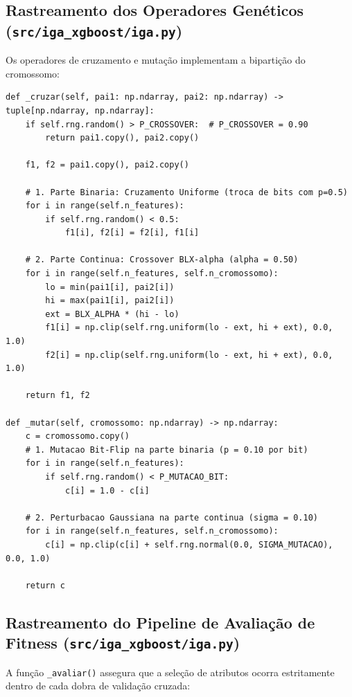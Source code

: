 \documentclass[11pt,a4paper]{article}
\begin{document}
\subsection{Rastreamento dos Operadores Genéticos (\texttt{src/iga\_xgboost/iga.py})}
Os operadores de cruzamento e mutação implementam a bipartição do cromossomo:

\begin{lstlisting}
def _cruzar(self, pai1: np.ndarray, pai2: np.ndarray) -> tuple[np.ndarray, np.ndarray]:
    if self.rng.random() > P_CROSSOVER:  # P_CROSSOVER = 0.90
        return pai1.copy(), pai2.copy()

    f1, f2 = pai1.copy(), pai2.copy()

    # 1. Parte Binaria: Cruzamento Uniforme (troca de bits com p=0.5)
    for i in range(self.n_features):
        if self.rng.random() < 0.5:
            f1[i], f2[i] = f2[i], f1[i]

    # 2. Parte Continua: Crossover BLX-alpha (alpha = 0.50)
    for i in range(self.n_features, self.n_cromossomo):
        lo = min(pai1[i], pai2[i])
        hi = max(pai1[i], pai2[i])
        ext = BLX_ALPHA * (hi - lo)
        f1[i] = np.clip(self.rng.uniform(lo - ext, hi + ext), 0.0, 1.0)
        f2[i] = np.clip(self.rng.uniform(lo - ext, hi + ext), 0.0, 1.0)

    return f1, f2

def _mutar(self, cromossomo: np.ndarray) -> np.ndarray:
    c = cromossomo.copy()
    # 1. Mutacao Bit-Flip na parte binaria (p = 0.10 por bit)
    for i in range(self.n_features):
        if self.rng.random() < P_MUTACAO_BIT:
            c[i] = 1.0 - c[i]

    # 2. Perturbacao Gaussiana na parte continua (sigma = 0.10)
    for i in range(self.n_features, self.n_cromossomo):
        c[i] = np.clip(c[i] + self.rng.normal(0.0, SIGMA_MUTACAO), 0.0, 1.0)

    return c
\end{lstlisting}

\subsection{Rastreamento do Pipeline de Avaliação de Fitness (\texttt{src/iga\_xgboost/iga.py})}
A função \texttt{\_avaliar()} assegura que a seleção de atributos ocorra estritamente dentro de cada dobra de validação cruzada:
\end{document}
